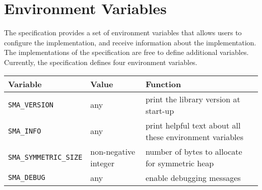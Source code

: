 
\section{Environment Variables }

The \openshmem specification provides a set of environment variables that allows users
to configure the \openshmem implementation, and receive information about the 
implementation. The implementations of the specification are
free to define additional variables. Currently, the specification defines four 
environment variables.

\medskip{}


\begin{tabular}{|l|l|l|}
\hline 
Variable & Value & Function\tabularnewline
\hline 
\hline 
\texttt{SMA\_VERSION} & any & print the library version at start-up\tabularnewline
\hline 
\texttt{SMA\_INFO} & any & print helpful text about all these environment variables\tabularnewline
\hline 
\texttt{SMA\_SYMMETRIC\_SIZE} & non-negative integer & number of bytes to allocate for symmetric heap\tabularnewline
\hline 
\texttt{SMA\_DEBUG} & any & enable debugging messages\tabularnewline
\hline 
\end{tabular}

\medskip{}
